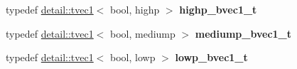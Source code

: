 \begin{DoxyCompactItemize}
\item 
typedef \hyperlink{structglm_1_1detail_1_1tvec1}{detail\+::tvec1}$<$ bool, highp $>$ {\bfseries highp\+\_\+bvec1\+\_\+t}\hypertarget{namespaceglm_a12dfb09db42f0b29fa85afa1ad2dbd23}{}\label{namespaceglm_a12dfb09db42f0b29fa85afa1ad2dbd23}

\item 
typedef \hyperlink{structglm_1_1detail_1_1tvec1}{detail\+::tvec1}$<$ bool, mediump $>$ {\bfseries mediump\+\_\+bvec1\+\_\+t}\hypertarget{namespaceglm_a84283cea80da3ae0e5a01763d5de143b}{}\label{namespaceglm_a84283cea80da3ae0e5a01763d5de143b}

\item 
typedef \hyperlink{structglm_1_1detail_1_1tvec1}{detail\+::tvec1}$<$ bool, lowp $>$ {\bfseries lowp\+\_\+bvec1\+\_\+t}\hypertarget{namespaceglm_aac18f6553a7720c78e2c294053fb0551}{}\label{namespaceglm_aac18f6553a7720c78e2c294053fb0551}


\end{DoxyCompactItemize}
